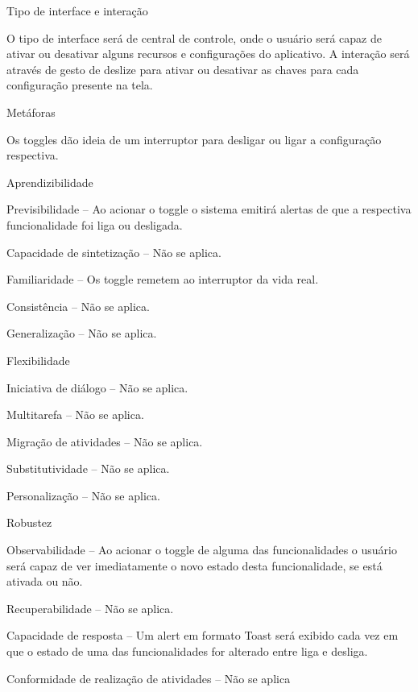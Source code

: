 \begin{alineas}
  \item Tipo de interface e interação
  
O tipo de interface será de central de controle, onde o usuário será capaz de ativar ou desativar alguns recursos e configurações do aplicativo. 
A interação será através de gesto de deslize para ativar ou desativar as chaves para cada configuração presente na tela.

  \item Metáforas
  
Os toggles dão ideia de um interruptor para desligar ou ligar a configuração respectiva.
  \item Aprendizibilidade
  
Previsibilidade – Ao acionar o toggle o sistema emitirá alertas de que a respectiva funcionalidade foi liga ou desligada.

Capacidade de sintetização – Não se aplica.

Familiaridade – Os toggle remetem ao interruptor da vida real. 

Consistência – Não se aplica.

Generalização – Não se aplica.

  \item Flexibilidade
  
Iniciativa de diálogo – Não se aplica.

Multitarefa – Não se aplica.

Migração de atividades – Não se aplica.

Substitutividade – Não se aplica.

Personalização – Não se aplica.

  \item Robustez
  
Observabilidade – Ao acionar o toggle de alguma das funcionalidades o usuário será capaz de ver imediatamente o novo estado desta funcionalidade, se está ativada ou não.

Recuperabilidade – Não se aplica.

Capacidade de resposta – Um alert em formato Toast será exibido cada vez em que o estado de uma das funcionalidades for alterado entre liga e desliga.

Conformidade de realização de atividades – Não se aplica
\end{alineas}

